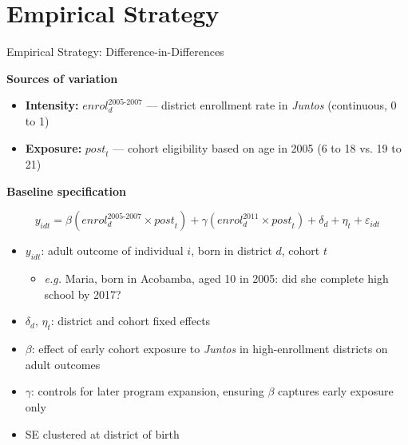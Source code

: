 \documentclass[aspectratio=169,usenames,dvipsnames]{beamer}
\begin{document}
\section{Empirical Strategy}
\begin{frame}{Empirical Strategy: Difference-in-Differences}\label{empirics}
\small

\textbf{Sources of variation}

\begin{itemize}
    \item \textbf{Intensity:} $\mathit{enrol}^{2005\text{-}2007}_{d}$ — district enrollment rate in \textit{Juntos} (continuous, 0 to 1)
    \item \textbf{Exposure:} $\mathit{post}_t$ — cohort eligibility based on age in 2005 (6 to 18 vs. 19 to 21)
\end{itemize}

\vspace{6pt}

\textbf{Baseline specification}

\vspace{-2pt}

\begin{equation*}
y_{idt} =
\beta \left(\mathit{enrol}^{2005\text{-}2007}_{d} \times \mathit{post}_t\right)
+ \gamma \left(\mathit{enrol}^{2011}_{d} \times \mathit{post}_t\right)
+ \delta_d + \eta_t + \varepsilon_{idt}
\end{equation*}

\vspace{4pt}

\begin{itemize}
    \item $y_{idt}$: adult outcome of individual $i$, born in district $d$, cohort $t$
    \begin{itemize}
        \item \textit{e.g.} Maria, born in Acobamba, aged 10 in 2005: did she complete high school by 2017?
    \end{itemize}
    \item $\delta_d$, $\eta_t$: district and cohort fixed effects
    \item $\beta$: effect of early cohort exposure to \textit{Juntos} in high-enrollment districts on adult outcomes
    \item $\gamma$: controls for later program expansion, ensuring $\beta$ captures early exposure only
    \item SE clustered at district of birth
\end{itemize}

\end{frame}
\end{document}
